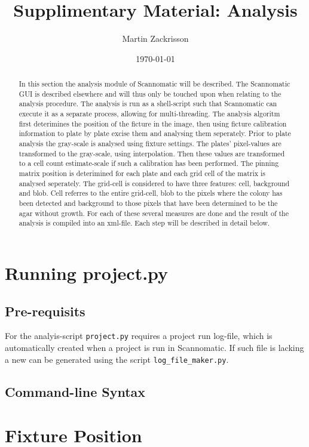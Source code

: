 \documentclass{article}
\title{Supplimentary Material: Analysis}
\author{Martin Zackrisson}
\date{\today}
\begin{document}
\maketitle
\begin{abstract}
In this section the analysis module of Scannomatic will be described.
The Scannomatic GUI is described elsewhere and will thus only be touched upon
when relating to the analysis procedure.
The analysis is run as a shell-script such that Scannomatic can execute it as
a separate process, allowing for multi-threading. 
The analysis algoritm first deterimines the position of the ficture in the image,
then using ficture calibration information to plate by plate excise them and 
analysing them seperately. 
Prior to plate analysis the gray-scale is analysed using fixture settings. 
The plates' pixel-values are transformed to the gray-scale, using interpolation.
Then these values are transformed to a cell count estimate-scale if such a 
calibration has been performed. 
The pinning matrix position is deterimined for each plate and each grid cell of
the matrix is analysed seperately.
The grid-cell is considered to have three features: cell, background and blob. 
Cell referres to the entire grid-cell, blob to the pixels where the colony has
been detected and background to those pixels that have been determined to be the
agar without growth.
For each of these several measures are done and the result of the analysis is
compiled into an xml-file.
Each step will be described in detail below.
\end{abstract}

\section{Running project.py}

\subsection{Pre-requisits}
For the analyis-script \texttt{project.py} requires a project run log-file, 
which is automatically created when a project is run in Scannomatic. 
If such file is lacking a new can be generated using the script 
\texttt{log\_file\_maker.py}.

\subsection{Command-line Syntax}

\section{Fixture Position}
\end{document}
